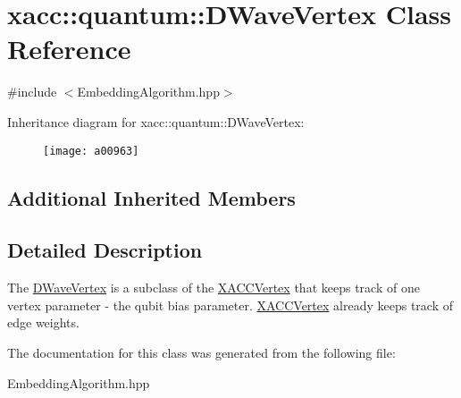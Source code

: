 \hypertarget{a00963}{}\section{xacc\+:\+:quantum\+:\+:D\+Wave\+Vertex Class Reference}
\label{a00963}


{\ttfamily \#include $<$Embedding\+Algorithm.\+hpp$>$}

Inheritance diagram for xacc\+:\+:quantum\+:\+:D\+Wave\+Vertex\+:\begin{figure}[H]
\begin{center}
\leavevmode
\texttt{[image: a00963]}
\end{center}
\end{figure}
\subsection*{Additional Inherited Members}


\subsection{Detailed Description}
The \hyperlink{a00963}{D\+Wave\+Vertex} is a subclass of the \hyperlink{a01199}{X\+A\+C\+C\+Vertex} that keeps track of one vertex parameter -\/ the qubit bias parameter. \hyperlink{a01199}{X\+A\+C\+C\+Vertex} already keeps track of edge weights. 

The documentation for this class was generated from the following file\+:\begin{DoxyCompactItemize}
\item 
Embedding\+Algorithm.\+hpp\end{DoxyCompactItemize}
